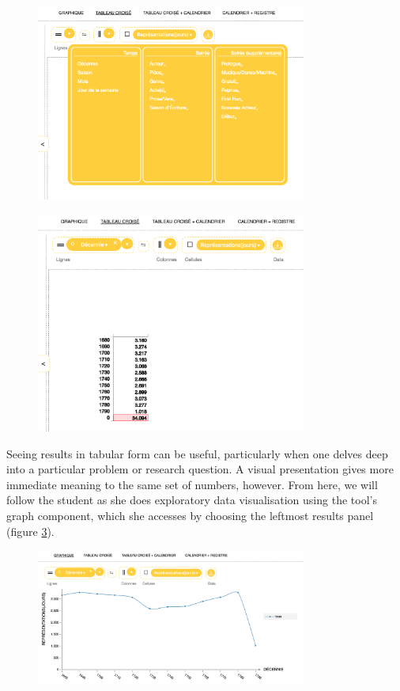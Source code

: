 \documentclass[	DIV=calc,%
							paper=a4,%
							fontsize=11pt,%
							twocolumn]{scrartcl}	 					%
\begin{document}
\begin{figure}
  \centering
	\includegraphics[width=3.5in]{steps/dimensions.png}
	\caption{}
	\label{fig:dimensions}
\end{figure}

\begin{figure}
  \centering
	\includegraphics[width=3.5in]{steps/performances_by_decade.png}
	\caption{}
	\label{fig:performances_by_decade}
\end{figure}

Seeing results in tabular form can be useful, particularly when one delves deep into a particular problem or research question.  A visual presentation gives more immediate meaning to the same set of numbers, however.  From here, we will follow the student as she does exploratory data visualisation using the tool’s graph component, which she accesses by choosing the leftmost results panel (figure \ref{fig:performances_by_decade_graph}).

\begin{figure}
  \centering
	\includegraphics[width=3.5in]{steps/performances_by_decade_graph.png}
	\caption{}
	\label{fig:performances_by_decade_graph}
\end{figure}
\end{document}
